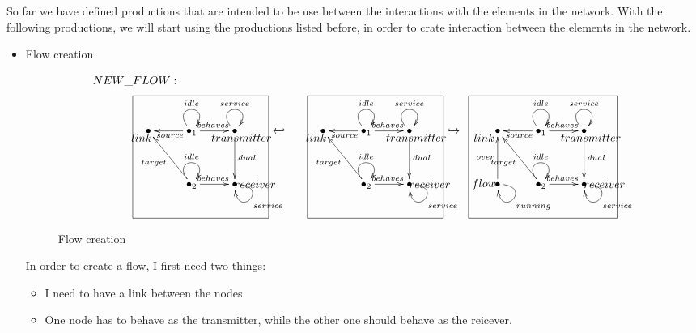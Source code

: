 \documentclass[envcountsect,runningheads]{llncs}
\begin{document}
  So far we have defined productions that are intended to be use between the interactions 
  with the elements in the network. With the following productions, we will start using the productions
  listed before, in order to crate interaction between the elements in the network. \\
  
  \begin{itemize}
    \item Flow creation
  \begin{figure}[H]
    \[
       \xymatrix@C=25pt@R=35pt
       {
         {}\POS[]-<1pc,0pc>\drop{NEW\_FLOW:}
         \\
         {\bullet} \POS[]-<.5pc,.5pc> \drop{link} &
         {\bullet}_{1} \ar@(ul,ur)^{idle} \ar@{->}^{behaves}[r] \ar@{->}^{source}[l] &
         {\bullet} \ar@(ul,ur)^{service} \ar@{->}^{dual}[d] \POS[]-<-0.5pc,.5pc> \drop{transmitter}
         & {\hookleftarrow} &
         {\bullet} \POS[]-<.5pc,.5pc> \drop{link} &
         {\bullet}_{1} \ar@(ul,ur)^{idle} \ar@{->}^{behaves}[r] \ar@{->}^{source}[l] &
         {\bullet} \ar@(ul,ur)^{service} \ar@{->}^{dual}[d] \POS[]-<-0.5pc,.5pc> \drop{transmitter}
         & {\hookrightarrow} &
         {\bullet} \POS[]-<1pc,.5pc> \drop{link} &
         {\bullet}_{1} \ar@(ul,ur)^{idle}\ar@{->}^{behaves}[r] \ar@{->}^{source}[l]
         &
         {\bullet} \ar@(ul,ur)^{service} \ar@{->}^{dual}[d] \POS[]-<-0.5pc,.5pc> \drop{transmitter}
         \\
         &
         {\bullet}_{2} \ar@(ul,ur)^{idle}\ar@{->}^{behaves}[r] \ar@{->}^{target}[ul] & 
         {\bullet} \ar@(r,d)^{service} \POS[]-<-1.5pc,0pc> \drop{receiver}
         \POS[]+<-2.5pc,2pc> *+=<10pc,9pc>[F-]{} & & &
         {\bullet}_{2} \ar@(ul,ur)^{idle}\ar@{->}^{behaves}[r] \ar@{->}^{target}[ul] & 
         {\bullet} \ar@(r,d)^{service} \POS[]-<-1.5pc,0pc> \drop{receiver}
         \POS[]+<-2.5pc,2pc> *+=<10pc,9pc>[F-]{} & &
         {\bullet} \ar@(r,d)^{running} \ar@{->}^{over}[u] \POS[]-<1pc,0pc> \drop{flow} &
         {\bullet}_{2} \ar@(ul,ur)^{idle}\ar@{->}^{behaves}[r] \ar@{->}^{target}[ul] & 
         {\bullet} \ar@(r,d)^{service} \POS[]-<-1.5pc,0pc> \drop{receiver}
         \POS[]+<-3pc,2pc> *+=<11pc,9pc>[F-]{}
       }
    \]
    \caption{Flow creation}
    \protect\label{fig:flowcreation}
  \end{figure}
  In order to create a flow, I first need two things: 
  \begin{itemize}
    \item I need to have a link between the nodes
    \item One node has to behave as the transmitter, while the other one should 
    behave as the reicever.  
   \end{itemize}
  

\end{itemize}
\end{document}

